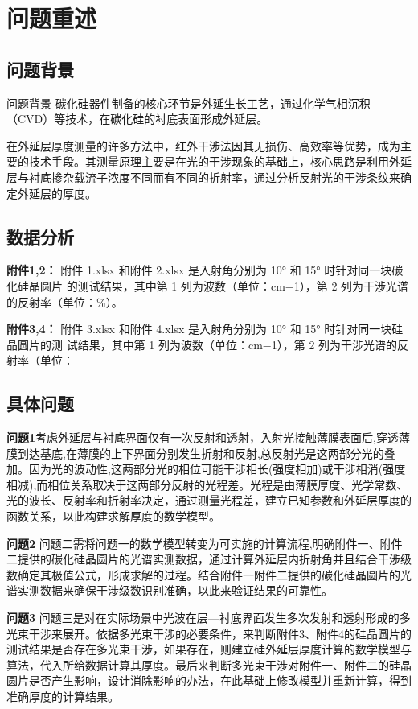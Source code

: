 \documentclass[withoutpreface,bwprint]{cumcmthesis}
\begin{document}
\section{问题重述}
\subsection{问题背景}
问题背景
碳化硅器件制备的核心环节是外延生长工艺，通过化学气相沉积（CVD）等技术，在碳化硅的衬底表面形成外延层。

在外延层厚度测量的许多方法中，红外干涉法因其无损伤、高效率等优势，成为主要的技术手段。其测量原理主要是在光的干涉现象的基础上，核心思路是利用外延层与衬底掺杂载流子浓度不同而有不同的折射率，通过分析反射光的干涉条纹来确定外延层的厚度。

\subsection{数据分析}
\textbf{附件1,2：}  附件 1.xlsx 和附件 2.xlsx 是入射角分别为 10° 和 15° 时针对同一块碳化硅晶圆片
 的测试结果，其中第 1 列为波数（单位：cm−1），第 2 列为干涉光谱的反射率（单位：\%）。

\textbf{附件3,4：} 附件 3.xlsx 和附件 4.xlsx 是入射角分别为 10° 和 15° 时针对同一块硅晶圆片的测
 试结果，其中第 1 列为波数（单位：cm−1），第 2 列为干涉光谱的反射率（单位：%

\subsection{具体问题}

\textbf{问题1}考虑外延层与衬底界面仅有一次反射和透射，入射光接触薄膜表面后,穿透薄膜到达基底,在薄膜的上下界面分别发生折射和反射,总反射光是这两部分光的叠加。因为光的波动性,这两部分光的相位可能干涉相长(强度相加)或干涉相消(强度相减),而相位关系取决于这两部分反射的光程差。光程是由薄膜厚度、光学常数、光的波长、反射率和折射率决定，通过测量光程差，建立已知参数和外延层厚度的函数关系，以此构建求解厚度的数学模型。

\textbf{问题2}  问题二需将问题一的数学模型转变为可实施的计算流程,明确附件一、附件二提供的碳化硅晶圆片的光谱实测数据，通过计算外延层内折射角并且结合干涉级数确定其极值公式，形成求解的过程。结合附件一附件二提供的碳化硅晶圆片的光谱实测数据来确保干涉级数识别准确，以此来验证结果的可靠性。

\textbf{问题3} 问题三是对在实际场景中光波在层—衬底界面发生多次发射和透射形成的多光束干涉来展开。依据多光束干涉的必要条件，来判断附件3、附件4的硅晶圆片的测试结果是否存在多光束干涉，如果存在，则建立硅外延层厚度计算的数学模型与算法，代入所给数据计算其厚度。最后来判断多光束干涉对附件一、附件二的硅晶圆片是否产生影响，设计消除影响的办法，在此基础上修改模型并重新计算，得到准确厚度的计算结果。
\end{document}
